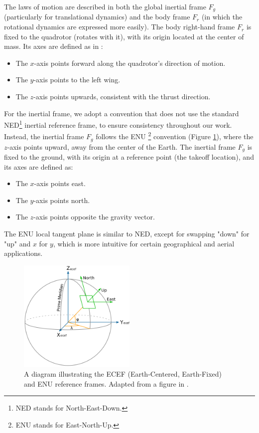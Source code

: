 The laws of motion are described in both the global inertial frame \( F_g \) 
(particularly for translational dynamics) and the body frame 
\( F_r \) (in which the rotational dynamics are expressed more 
easily). The body right-hand frame \( F_r \) is fixed to the quadrotor 
(rotates with it), with its 
origin located at the center of mass.
Its axes are defined as in \cite{model_quadrotor}:
\noindent
\begin{itemize}
    \item The \( x \)-axis points forward along the quadrotor's direction 
    of motion.
    \item The \( y \)-axis points to the left wing.
    \item The \( z \)-axis points upwards, consistent with 
    the thrust direction.
\end{itemize}

\noindent
For the inertial frame, we adopt a convention that does not use 
the standard NED\footnote{NED stands for North-East-Down.} inertial 
reference frame, to ensure consistency throughout our work. 
Instead, the inertial frame \( F_g \) follows the ENU 
\footnote{ENU stands for East-North-Up.} 
convention (Figure \ref{fig:ENU}), where the 
\( z \)-axis points upward, away from the center of the Earth. The 
inertial frame \( F_g \) is fixed to the ground, with its origin at a 
reference point (the takeoff location), and its axes are defined as:
\begin{itemize}
    \item The \( x \)-axis points east.
    \item The \( y \)-axis points north.
    \item The \( z \)-axis points opposite the gravity vector.
\end{itemize}
The ENU local tangent plane is similar to NED, except for swapping 
"down" for "up" and \( x \) for \( y \), which is more intuitive for certain 
geographical and aerial applications.

\begin{figure}[h!]
    \centering
    \includegraphics[width=0.5\textwidth]{images/ECEF_ENU_Longitude_Latitude_relationships.png}
    \caption[ENU and ECEF Reference Frames]{A diagram illustrating the ECEF (Earth-Centered, Earth-Fixed) 
    and ENU reference frames. 
    Adapted from a figure in \cite{ENU}.}
    \label{fig:ENU}
\end{figure}

